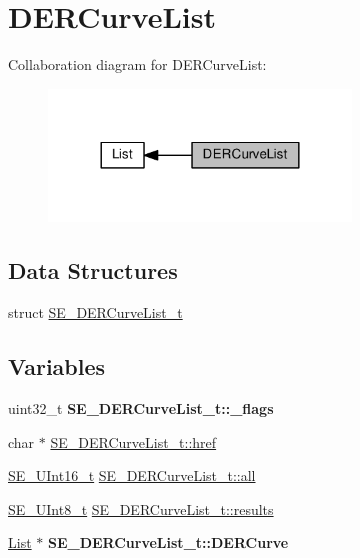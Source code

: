 \hypertarget{group__DERCurveList}{}\section{D\+E\+R\+Curve\+List}
\label{group__DERCurveList}
Collaboration diagram for D\+E\+R\+Curve\+List\+:\nopagebreak
\begin{figure}[H]
\begin{center}
\leavevmode
\includegraphics[width=228pt]{group__DERCurveList}
\end{center}
\end{figure}
\subsection*{Data Structures}
\begin{DoxyCompactItemize}
\item 
struct \hyperlink{structSE__DERCurveList__t}{S\+E\+\_\+\+D\+E\+R\+Curve\+List\+\_\+t}
\end{DoxyCompactItemize}
\subsection*{Variables}
\begin{DoxyCompactItemize}
\item 
\mbox{\label{group__DERCurveList_ga4452f937508f015df586353046c2e461}} 
uint32\+\_\+t {\bfseries S\+E\+\_\+\+D\+E\+R\+Curve\+List\+\_\+t\+::\+\_\+flags}
\item 
char $\ast$ \hyperlink{group__DERCurveList_ga6c40f574e49a75c46718995d9bddad2b}{S\+E\+\_\+\+D\+E\+R\+Curve\+List\+\_\+t\+::href}
\item 
\hyperlink{group__UInt16_gac68d541f189538bfd30cfaa712d20d29}{S\+E\+\_\+\+U\+Int16\+\_\+t} \hyperlink{group__DERCurveList_gae5f34a94cb9aea726f86402b5bba15a5}{S\+E\+\_\+\+D\+E\+R\+Curve\+List\+\_\+t\+::all}
\item 
\hyperlink{group__UInt8_gaf7c365a1acfe204e3a67c16ed44572f5}{S\+E\+\_\+\+U\+Int8\+\_\+t} \hyperlink{group__DERCurveList_ga66af910e33eb63a39319b0e525723987}{S\+E\+\_\+\+D\+E\+R\+Curve\+List\+\_\+t\+::results}
\item 
\mbox{\label{group__DERCurveList_gaaa17b653e05e5349ba2924c8fdecf4f9}} 
\hyperlink{structList}{List} $\ast$ {\bfseries S\+E\+\_\+\+D\+E\+R\+Curve\+List\+\_\+t\+::\+D\+E\+R\+Curve}
\end{DoxyCompactItemize}


